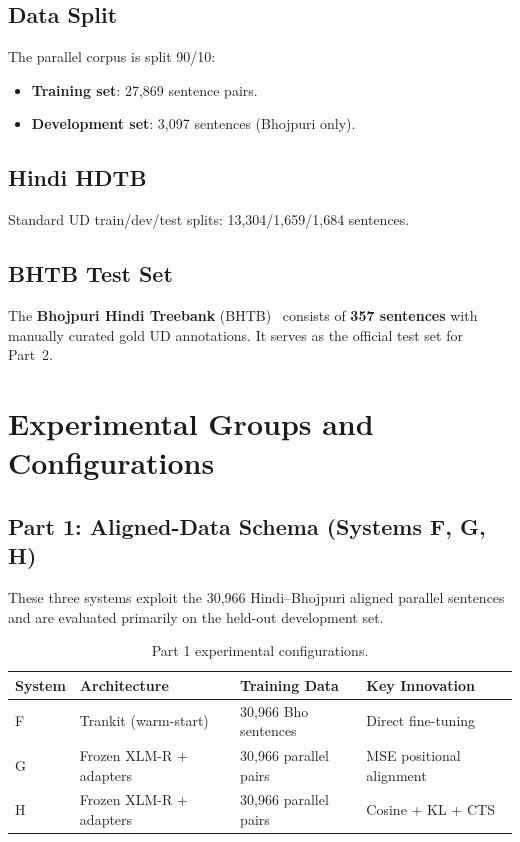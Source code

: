 \documentclass[12pt,a4paper,oneside]{report}
\begin{document}
\subsection{Data Split}

The parallel corpus is split 90/10:
\begin{itemize}
  \item \textbf{Training set}: 27,869 sentence pairs.
  \item \textbf{Development set}: 3,097 sentences (Bhojpuri only).
\end{itemize}

\subsection{Hindi HDTB}

Standard UD train/dev/test splits: 13,304/1,659/1,684 sentences.

\subsection{BHTB Test Set}

The \textbf{Bhojpuri Hindi Treebank} (BHTB)~\citep{bhtb2022} consists of
\textbf{357 sentences} with manually curated gold UD annotations. It serves as the
official test set for Part~2.

\section{Experimental Groups and Configurations}

\subsection{Part 1: Aligned-Data Schema (Systems F, G, H)}

These three systems exploit the 30,966 Hindi--Bhojpuri aligned parallel sentences and are
evaluated primarily on the held-out development set.

\begin{table}[ht]
\centering
\caption{Part 1 experimental configurations.}
\label{tab:comp1_configs}
\begin{tabular}{@{}llll@{}}
\toprule
\textbf{System} & \textbf{Architecture} & \textbf{Training Data} & \textbf{Key Innovation} \\
\midrule
F & Trankit (warm-start) & 30,966 Bho sentences & Direct fine-tuning \\
G & Frozen XLM-R + adapters & 30,966 parallel pairs & MSE positional alignment \\
H & Frozen XLM-R + adapters & 30,966 parallel pairs & Cosine + KL + CTS \\
\bottomrule
\end{tabular}
\end{table}
\end{document}
